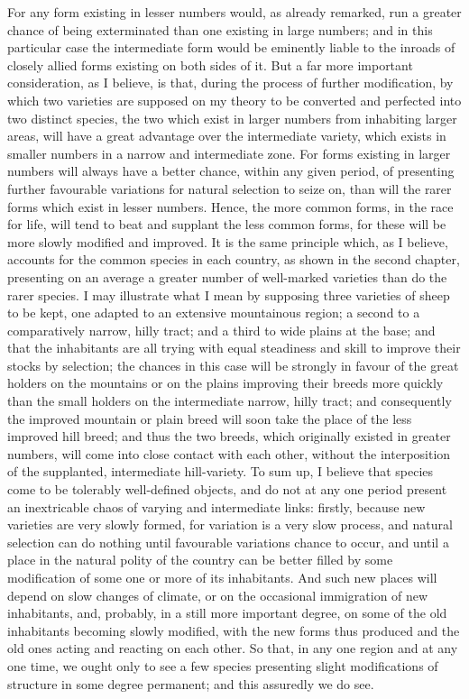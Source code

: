 For any form existing in lesser numbers would, as already remarked, run a greater chance of being exterminated than one existing in large numbers; and in this particular case the intermediate form would be eminently liable to the inroads of closely allied forms existing on both sides of it. But a far more important consideration, as I believe, is that, during the process of further modification, by which two varieties are supposed on my theory to be converted and perfected into two distinct species, the two which exist in larger numbers from inhabiting larger areas, will have a great advantage over the intermediate variety, which exists in smaller numbers in a narrow and intermediate zone. For forms existing in larger numbers will always have a better chance, within any given period, of presenting further favourable variations for natural selection to seize on, than will the rarer forms which exist in lesser numbers. Hence, the more common forms, in the race for life, will tend to beat and supplant the less common forms, for these will be more slowly modified and improved. It is the same principle which, as I believe, accounts for the common species in each country, as shown in the second chapter, presenting on an average a greater number of well-marked varieties than do the rarer species. I may illustrate what I mean by supposing three varieties of sheep to be kept, one adapted to an extensive mountainous region; a second to a comparatively narrow, hilly tract; and a third to wide plains at the base; and that the inhabitants are all trying with equal steadiness and skill to improve their stocks by selection; the chances in this case will be strongly in favour of the great holders on the mountains or on the plains improving their breeds more quickly than the small holders on the intermediate narrow, hilly tract; and consequently the improved mountain or plain breed will soon take the place of the less improved hill breed; and thus the two breeds, which originally existed in greater numbers, will come into close contact with each other, without the interposition of the supplanted, intermediate hill-variety.
To sum up, I believe that species come to be tolerably well-defined objects, and do not at any one period present an inextricable chaos of varying and intermediate links: firstly, because new varieties are very slowly formed, for variation is a very slow process, and natural selection can do nothing until favourable variations chance to occur, and until a place in the natural polity of the country can be better filled by some modification of some one or more of its inhabitants. And such new places will depend on slow changes of climate, or on the occasional immigration of new inhabitants, and, probably, in a still more important degree, on some of the old inhabitants becoming slowly modified, with the new forms thus produced and the old ones acting and reacting on each other. So that, in any one region and at any one time, we ought only to see a few species presenting slight modifications of structure in some degree permanent; and this assuredly we do see.
